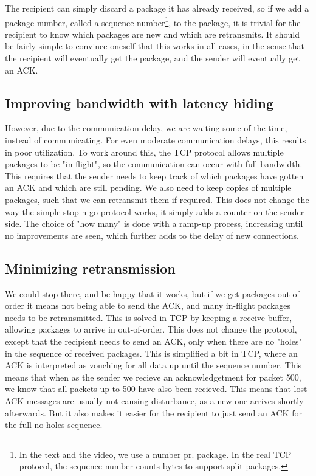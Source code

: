 The recipient can simply discard a package it has already received, so if we add a package number, called a sequence number\footnote{In the text and the video, we use a number pr. package. In the real TCP protocol, the sequence number counts bytes to support split packages.}, to the package, it is trivial for the recipient to know which packages are new and which are retransmits. It should be fairly simple to convince oneself that this works in all cases, in the sense that the recipient will eventually get the package, and the sender will eventually get an ACK.

\subsection{Improving bandwidth with latency hiding}
However, due to the communication delay, we are waiting some of the time, instead of communicating. For even moderate communication delays, this results in poor utilization. To work around this, the TCP protocol allows multiple packages to be "in-flight", so the communication can occur with full bandwidth. This requires that the sender needs to keep track of which packages have gotten an ACK and which are still pending. We also need to keep copies of multiple packages, such that we can retransmit them if required. This does not change the way the simple stop-n-go protocol works, it simply adds a counter on the sender side. The choice of "how many" is done with a ramp-up process, increasing until no improvements are seen, which further adds to the delay of new connections.

\subsection{Minimizing retransmission}
We could stop there, and be happy that it works, but if we get packages out-of-order it means not being able to send the ACK, and many in-flight packages needs to be retransmitted. This is solved in TCP by keeping a receive buffer, allowing packages to arrive in out-of-order. This does not change the protocol, except that the recipient needs to send an ACK, only when there are no "holes" in the sequence of received packages. This is simplified a bit in TCP, where an ACK is interpreted as vouching for all data up until the sequence number. This means that when as the sender we recieve an acknowledgetment for packet 500, we know that all packets up to 500 have also been recieved. This means that lost ACK messages are usually not causing disturbance, as a new one arrives shortly afterwards. But it also makes it easier for the recipient to just send an ACK for the full no-holes sequence.

